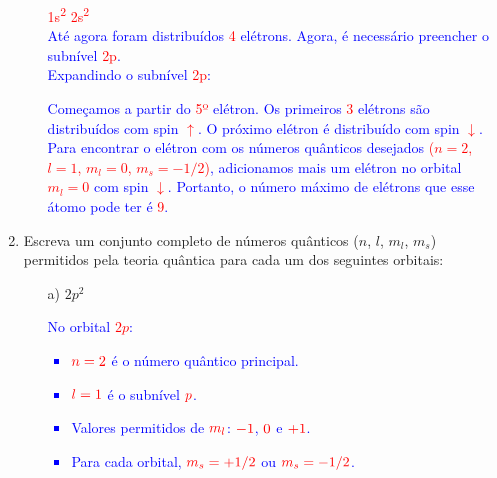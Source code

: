 \documentclass[a4paper, 12pt]{article}
\begin{document}
\begin{enumerate}
\begin{enumerate}
		            
		            \vspace{10pt}
		            
		            \text{\textcolor{blue}{Fazemos a distribuição dos elétrons}:}
		            \textcolor{red}{
			            1s\textsuperscript{2} \quad 2s\textsuperscript{2}
		            }
		            \\[10pt] 
		            \textcolor{blue}{Até agora foram distribuídos \textcolor{red}{4} elétrons. Agora, é necessário preencher o subnível \textcolor{red}{2p}.}
		            \\[10pt]
		            \textcolor{blue}{Expandindo o subnível \textcolor{red}{2p}:}
		            
		            
		            
		            \textcolor{blue}{Começamos a partir do \textcolor{red}{5º} elétron. Os primeiros \textcolor{red}{3} elétrons são distribuídos com spin \textcolor{red}{\(\uparrow\)}. O próximo elétron é distribuído com spin \textcolor{red}{\(\downarrow\)}. Para encontrar o elétron com os números quânticos desejados \textcolor{red}{(\(n = 2\), \(l = 1\), \(m_l = 0\), \(m_s = -1/2\))}, adicionamos mais um elétron no orbital \textcolor{red}{\(m_l = 0\)} com spin \textcolor{red}{\(\downarrow\)}.}
		            \textcolor{blue}{Portanto, o número máximo de elétrons que esse átomo pode ter é \textcolor{red}{9}.}
		            
	      \end{enumerate}
	      
	\item Escreva um conjunto completo de números quânticos (\(n\), \(l\), \(m_l\), \(m_s\)) permitidos pela teoria quântica para cada um dos seguintes orbitais:
	      \begin{enumerate}
		      \item[a)] \(2p^2\)
		            
		            \textcolor{blue}{No orbital \textcolor{red}{\(2p\)}:}
		            \textcolor{blue}{
			            \begin{itemize}
				            \item \textcolor{blue}{\( \textcolor{red}{n = 2} \) é o número quântico principal.}
				            \item \textcolor{blue}{\( \textcolor{red}{l = 1} \) é o subnível \( \textcolor{red}{p} \).}
				            \item \textcolor{blue}{Valores permitidos de \( \textcolor{red}{m_l} \): \( \textcolor{red}{-1} \), \( \textcolor{red}{0} \) e \( \textcolor{red}{+1} \).}
				            \item \textcolor{blue}{Para cada orbital, \( \textcolor{red}{m_s = +1/2} \) ou \( \textcolor{red}{m_s = -1/2} \).}
			            \end{itemize}}
		            

\end{enumerate}
\end{enumerate}
\end{document}
